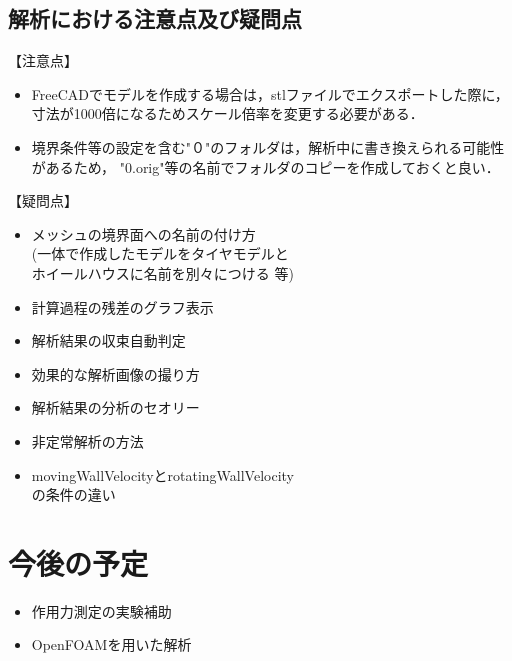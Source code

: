 \documentclass[twocolumn,a4j]{jsarticle}
\begin{document}
\subsection{解析における注意点及び疑問点}
\noindent【注意点】
\begin{itemize}
    \item FreeCADでモデルを作成する場合は，stlファイルでエクスポートした際に，
          寸法が1000倍になるためスケール倍率を変更する必要がある．
    \item 境界条件等の設定を含む"０"のフォルダは，解析中に書き換えられる可能性があるため，
          "0.orig"等の名前でフォルダのコピーを作成しておくと良い．
\end{itemize}
\noindent【疑問点】
\begin{itemize}
    \item メッシュの境界面への名前の付け方\\
          (一体で作成したモデルをタイヤモデルと\\ \quad ホイールハウスに名前を別々につける 等)
    \item 計算過程の残差のグラフ表示
    \item 解析結果の収束自動判定
    \item 効果的な解析画像の撮り方
    \item 解析結果の分析のセオリー
    \item 非定常解析の方法
    \item movingWallVelocityとrotatingWallVelocity\\の条件の違い
\end{itemize}
\section{今後の予定}
\begin{itemize}
    \item 作用力測定の実験補助
    \item OpenFOAMを用いた解析
\end{itemize}
\end{document}
